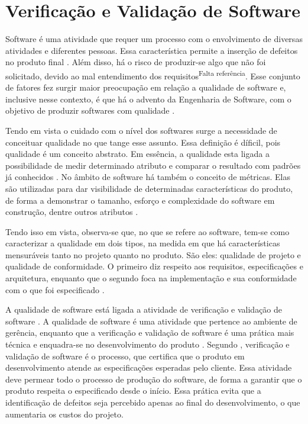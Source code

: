 \section{Verificação e Validação de Software}
Software é uma atividade que requer um processo com o envolvimento de diversas atividades e diferentes pessoas. Essa característica permite a inserção de defeitos no produto final \cite{trodo_2009}. Além disso, há o risco de produzir-se algo que não foi solicitado, devido ao mal entendimento dos requisitos\textsuperscript{Falta referência}. Esse conjunto de fatores fez surgir maior preocupação em relação a qualidade de software e, inclusive nesse contexto, é que há o advento da Engenharia de Software, com o objetivo de produzir softwares com qualidade \cite{bueno_e_campelo_2013}.
\par
\indent Tendo em vista o cuidado com o nível dos softwares surge a necessidade de conceituar qualidade no que tange esse assunto. Essa definição é díficil, pois qualidade é um conceito abstrato. Em essência, a qualidade esta ligada a possibilidade de medir determinado atributo e comparar o resultado com padrões já conhecidos \cite{bueno_e_campelo_2013}. No âmbito de software há também o conceito de métricas. Elas são utilizadas para dar visibilidade de determinadas características do produto, de forma a demonstrar o tamanho, esforço e complexidade do software em construção, dentre outros atributos \cite{abreu_2011}.
\par
\indent Tendo isso em vista, observa-se que, no que se refere ao software, tem-se como caracterizar a qualidade em dois tipos, na medida em que há características mensuráveis tanto no projeto quanto no produto. São eles: qualidade de projeto e qualidade de conformidade. O primeiro diz respeito aos requisitos, especificações e arquitetura, enquanto que o segundo foca na implementação e sua conformidade com o que foi especificado \cite{bueno_e_campelo_2013}.
\par
\indent A qualidade de software está ligada a atividade de verificação e validação de software \cite{bueno_e_campelo_2013}. A qualidade de software é uma atividade que pertence ao ambiente de gerência, enquanto que a verificação e validação de software é uma prática mais técnica e enquadra-se no desenvolvimento do produto \cite{bueno_e_campelo_2013}. Segundo , verificação e validação de software é o processo, que certifica que o produto em desenvolvimento atende as especificações esperadas pelo cliente. Essa atividade deve permear todo o processo de produção do software, de forma a garantir que o produto respeita o especificado desde o início. Essa prática evita que a identificação de defeitos seja percebido apenas ao final do desenvolvimento, o que aumentaria os custos do projeto.
